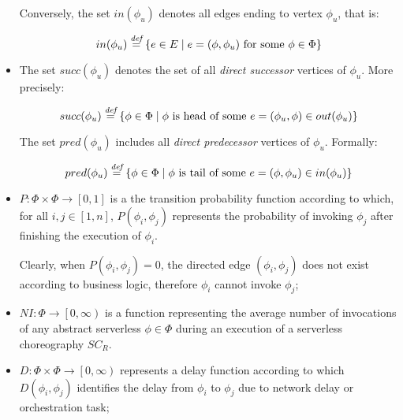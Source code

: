 \begin{itemize}
	Conversely, the set $in(\phi_u)$ denotes all edges ending to vertex $\phi_u$, that is:

	\begin{equation}\label{outDef}
	in(\phi_u) \overset{\textit{def}}{=} \left\lbrace e \in E \mid e = (\phi, \phi_u) \text{ for some } \phi \in \Phi  \right\rbrace 
	\end{equation}

	\item The set $succ(\phi_u)$ denotes the set of all \textit{direct successor} vertices of $\phi_u$. More precisely:
	
	\begin{equation}\label{outDef}
		succ(\phi_u) \overset{\textit{def}}{=} \left\lbrace \phi \in \Phi \mid \phi \text{ is head of some } e = (\phi_u, \phi) \in out(\phi_u)  \right\rbrace 
	\end{equation}

	The set $pred(\phi_u)$ includes all \textit{direct predecessor} vertices of $\phi_u$. Formally: 
	
	\begin{equation}\label{outDef}
		pred(\phi_u) \overset{\textit{def}}{=} \left\lbrace \phi \in \Phi \mid \phi \text{ is tail of some } e = (\phi, \phi_u) \in in(\phi_u)  \right\rbrace 
	\end{equation}
	
	
	\item $P : \Phi \times \Phi \to \left[ 0, 1 \right]$ is a the transition probability function according to which, for all $i,j \in \left[ 1, n \right]$, $P\left(\phi_i, \phi_j \right)$ represents the probability of invoking $\phi_j$ after finishing the execution of $\phi_i$. 
	
	Clearly, when $P\left(\phi_i, \phi_j \right) = 0$, the directed edge $\left( \phi_i, \phi_j \right)$ does not exist according to business logic, therefore $\phi_i$ cannot invoke $\phi_j$;
	
	\item $NI: \Phi \to \left[ 0, \infty \right)$ is a function representing the average number of invocations of any abstract serverless $\phi \in \Phi$ during an execution of a serverless choreography $SC_R$.
	
	\item $D : \Phi \times \Phi \to \left[ 0, \infty \right)$ represents a delay function according to which $D\left(\phi_i, \phi_j \right)$ identifies the delay from $\phi_i$ to $\phi_j$ due to network delay or orchestration task;  
	
\end{itemize}

